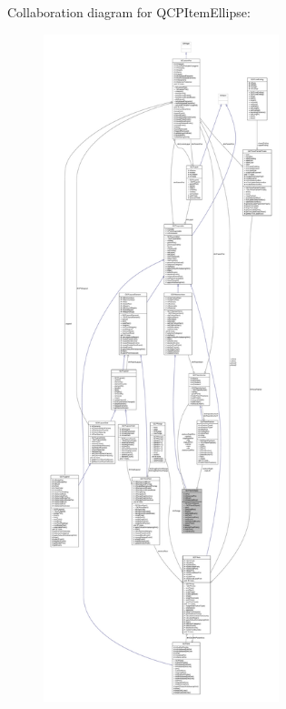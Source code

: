 Collaboration diagram for Q\+C\+P\+Item\+Ellipse\+:\nopagebreak
\begin{figure}[H]
\begin{center}
\leavevmode
\includegraphics[height=550pt]{class_q_c_p_item_ellipse__coll__graph}
\end{center}
\end{figure}
